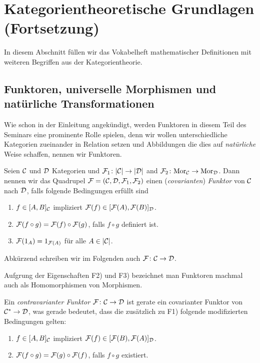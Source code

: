 \section{Kategorientheoretische Grundlagen (Fortsetzung)}

In diesem Abschnitt füllen wir das Vokabelheft mathematischer Definitionen mit weiteren Begriffen aus der Kategorientheorie.

\subsection{Funktoren, universelle Morphismen und natürliche Transformationen}

Wie schon in der Einleitung angekündigt, werden Funktoren in diesem Teil des Seminars eine prominente Rolle spielen, denn wir wollen unterschiedliche Kategorien zueinander in Relation setzen und Abbildungen die dies auf \emph{natürliche} Weise schaffen, nennen wir Funktoren.

\begin{defn}
  Seien $\mathcal{C}$ und $\mathcal{D}$ Kategorien und $\mathcal{F}_1 \colon |\mathcal{C}| \to |\mathcal{D}|$ and $\mathcal{F}_2 \colon \mathrm{Mor}_{\mathcal{C}}\to \mathrm{Mor}_{\mathcal{D}}$. 
  Dann nennen wir das Quadrupel $\mathcal{F} = (\mathcal{C}, \mathcal{D}, \mathcal{F}_1, \mathcal{F}_2)$ einen (\emph{covarianten}) \emph{Funktor} von $\mathcal{C}$ nach $\mathcal{D}$, falls folgende Bedingungen erfüllt sind
  \begin{enumerate}[F1)]
    \item $f \in [A, B]_{\mathcal{C}}$ impliziert $\mathcal{F}(f) \in [\mathcal{F}(A), \mathcal{F}(B)]_{\mathcal{D}}$.
    \item $\mathcal{F}(f \circ g) = \mathcal{F}(f) \circ \mathcal{F}(g)$, falls $f \circ g$ definiert ist.
    \item $\mathcal{F}(1_A) = 1_{\mathcal{F}(A)}$ für alle $A \in |\mathcal{C}|$.
  \end{enumerate}
  Abkürzend schreiben wir im Folgenden auch $\mathcal{F} \colon \mathcal{C} \to \mathcal{D}$.
\end{defn}

Aufgrung der Eigenschaften F2) und F3) bezeichnet man Funktoren machmal auch als Homomorphismen von Morphismen.

Ein \emph{contravarianter Funktor} $\mathcal{F} \colon \mathcal{C} \to \mathcal{D}$ ist gerate ein covarianter Funktor von $\mathcal{C}^* \to \mathcal{D}$, was gerade bedeutet, dass die zusätzlich zu F1) folgende modifizierten Bedingungen gelten:
\begin{enumerate}[F1')]
  \item $f \in [A, B]_{\mathcal{C}}$ impliziert $\mathcal{F}(f) \in [\mathcal{F}(B), \mathcal{F}(A)]_{\mathcal{D}}$.
  \item $\mathcal{F}(f \circ g) = \mathcal{F}(g) \circ \mathcal{F}(f)$, falls $f \circ g$ existiert.
\end{enumerate}

